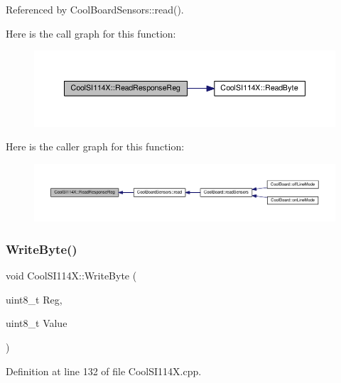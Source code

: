 Referenced by Cool\+Board\+Sensors\+::read().

Here is the call graph for this function\+:
\nopagebreak
\begin{figure}[H]
\begin{center}
\leavevmode
\includegraphics[width=350pt]{dd/d67/class_cool_s_i114_x_a869d3825147831d707f7ef324a665646_cgraph}
\end{center}
\end{figure}
Here is the caller graph for this function\+:
\nopagebreak
\begin{figure}[H]
\begin{center}
\leavevmode
\includegraphics[width=350pt]{dd/d67/class_cool_s_i114_x_a869d3825147831d707f7ef324a665646_icgraph}
\end{center}
\end{figure}
\mbox{\label{class_cool_s_i114_x_ac5c8dc5ade604da7a1c8cd1586feefc2}} 
\subsubsection{\texorpdfstring{Write\+Byte()}{WriteByte()}}
{\footnotesize\ttfamily void Cool\+S\+I114\+X\+::\+Write\+Byte (\begin{DoxyParamCaption}\item[{uint8\+\_\+t}]{Reg,  }\item[{uint8\+\_\+t}]{Value }\end{DoxyParamCaption})\hspace{0.3cm}{\ttfamily [private]}}



Definition at line 132 of file Cool\+S\+I114\+X.\+cpp.



